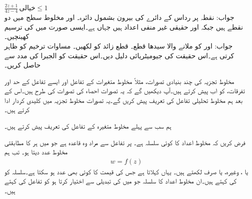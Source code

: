 \quad
$\tfrac{2z+1}{4z-4}\,\text{خیالی}\le 1$\\
جواب:\quad
نقطہ  پر رداس  کے دائرے کی بیرون بشمول دائرہ۔
\quad
{} اور  مخلوط سطح میں دو نقطے ہیں جبکہ  اور  حقیقی غیر منفی اعداد ہیں جہاں  ہے۔ایسی صورت میں  کی ترسیم کھینچیں۔\\
جواب:\quad
{} اور  کو ملانے والا سیدھا قطع۔
\quad
قطع زائد  کو  لکھیں۔
\quad
مساوات  ترخیم کو ظاہر کرتی ہے۔اس حقیقت کی جیومیٹریائی دلیل دیں۔اس حقیقت کو الجبرا کی مدد سے حاصل کریں۔ 

مخلوط تجزیہ کی چند بنیادی تصورات، مثلاً مخلوط متغیرات کے تفاعل اور ایسے تفاعل کے حد اور تفرقات، کو اب پیش کرتے ہیں۔آپ دیکھیں گے کہ یہ تصورات احصاء کی تصورات کی طرح ہیں۔اس کے بعد ہم مخلوط تحلیلی تفاعل کی تعریف پیش کریں گے۔یہ تصورات مخلوط تجزیہ میں کلیدی کردار ادا کرتے ہیں۔

ہم سب سے پہلے مخلوط متغیرہ کے تفاعل کی تعریف پیش کرتے ہیں۔

فرض کریں کہ  مخلوط اعداد کا کوئی سلسلہ ہے۔ پر  تفاعل سے مراد وہ قاعدہ ہے  جو  میں ہر  کا مطابقتی   مخلوط عدد  دیتا ہو۔ تب ہم
\begin{align*}
w=f(z)
\end{align*}
یا ، وغیرہ، یا صرف  لکھتے ہیں۔ یہاں   کہلاتا ہے جس کی قیمت  کا کوئی بھی عدد ہو سکتا ہے۔سلسلہ  کو  کی  کہتے ہیں۔ان مخلوط اعداد کا سلسلہ جو  میں  کی تبدیلی سے  اختیار کرتا ہو کو تفاعل  کی  کہتے ہیں۔

